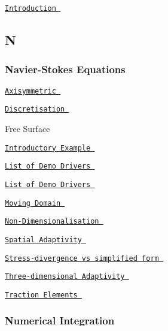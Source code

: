  
\begin{DoxyItemize}
\item  \href{ ../../poisson/two_d_poisson_flux_bc2/html/index.html }{\tt Introduction }  
\end{DoxyItemize}  \subsection*{ N }

 \subsubsection*{ Navier-\/\-Stokes Equations }

 
\begin{DoxyItemize}
\item  \href{ ../../axisym_navier_stokes/spin_up/html/index.html }{\tt Axisymmetric }  
\item  \href{ ../../navier_stokes/driven_cavity/html/index.html#element_types }{\tt Discretisation }  
\item  Free Surface   
\begin{DoxyItemize}
\item  \href{ ../../navier_stokes/single_layer_free_surface/html/index.html }{\tt Introductory Example }  
\item  \href{ ../../example_code_list/html/index.html#free_surface_nst }{\tt List of Demo Drivers }  
\end{DoxyItemize} 
\item  \href{ ../../example_code_list/html/index.html#nst }{\tt List of Demo Drivers }  
\item  \href{ ../../navier_stokes/osc_ellipse/html/index.html }{\tt Moving Domain }  
\item  \href{ ../../navier_stokes/driven_cavity/html/index.html#equation }{\tt Non-\/\-Dimensionalisation }  
\item  \href{ ../../navier_stokes/adaptive_driven_cavity/html/index.html }{\tt Spatial Adaptivity }  
\item  \href{ ../../navier_stokes/circular_driven_cavity/html/index.html#stress_divergence }{\tt Stress-\/divergence vs simplified form }  
\item  \href{ ../../navier_stokes/three_d_entry_flow/html/index.htm }{\tt Three-\/dimensional Adaptivity }  
\item  \href{ ../../navier_stokes/rayleigh_traction_channel/html/index.html#traction_theory }{\tt Traction Elements }  
\end{DoxyItemize} \subsubsection*{ Numerical Integration }

